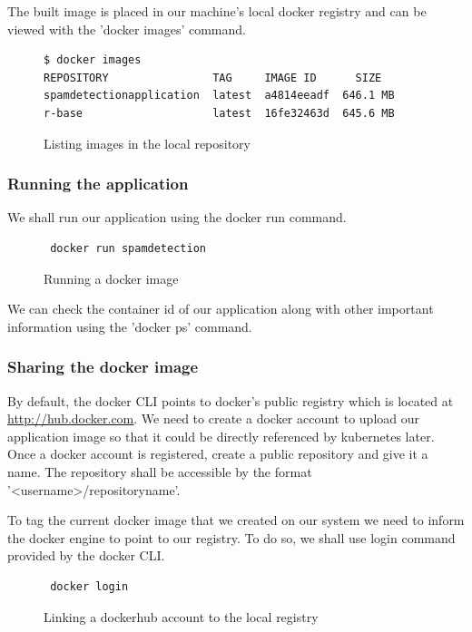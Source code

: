 \documentclass[9pt,twocolumn,twoside]{../../styles/osajnl}
\begin{document}
The built image is placed in our machine's local docker registry and
can be viewed with the 'docker images' command.

\begin{figure}[H]
\begin{verbatim}
$ docker images
REPOSITORY                TAG     IMAGE ID      SIZE
spamdetectionapplication  latest  a4814eeadf  646.1 MB
r-base                    latest  16fe32463d  645.6 MB
\end{verbatim}                   
\caption{Listing images in the local repository}
\label{Listing images in the local repository}
\end{figure}

\subsubsection{Running the application}

We shall run our application using the docker run command.

\begin{figure}[H]
\begin{verbatim}
 docker run spamdetection
\end{verbatim}
\caption{Running a docker image}
\label{Running a docker image}
\end{figure}

We can check the container id of our application along with other
important information using the 'docker ps' command.
 
\subsubsection{Sharing the docker image}

By default, the docker CLI points to docker's public registry which is
located at \url{http://hub.docker.com}. We need to create a docker
account to upload our application image so that it could be directly
referenced by kubernetes later. Once a docker account is registered,
create a public repository and give it a name. The repository shall be
accessible by the format '<username>/repositoryname'.

To tag the current docker image that we created on our system we need
to inform the docker engine to point to our registry. To do so, we
shall use login command provided by the docker CLI.

\begin{figure}[H]
\begin{verbatim}
 docker login
\end{verbatim}
\caption{Linking a dockerhub account to the local registry}
\label{Linking a dockerhub account to the local registry}
\end{figure}
\end{document}

